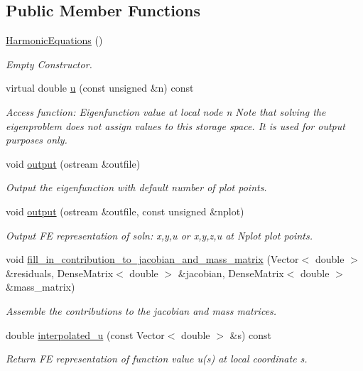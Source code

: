 \subsection*{Public Member Functions}
\begin{DoxyCompactItemize}
\item 
\hyperlink{classHarmonicEquations_a288d1c0777b2cf5360e1310d48f8c217}{Harmonic\+Equations} ()
\begin{DoxyCompactList}\small\item\em Empty Constructor. \end{DoxyCompactList}\item 
virtual double \hyperlink{classHarmonicEquations_ab801694318460d371e066419263995d7}{u} (const unsigned \&n) const
\begin{DoxyCompactList}\small\item\em Access function\+: Eigenfunction value at local node n Note that solving the eigenproblem does not assign values to this storage space. It is used for output purposes only. \end{DoxyCompactList}\item 
void \hyperlink{classHarmonicEquations_abe34292042ce1394f8979618ee10f354}{output} (ostream \&outfile)
\begin{DoxyCompactList}\small\item\em Output the eigenfunction with default number of plot points. \end{DoxyCompactList}\item 
void \hyperlink{classHarmonicEquations_ab5e53f73bbefb6509ad014c3b236e31f}{output} (ostream \&outfile, const unsigned \&nplot)
\begin{DoxyCompactList}\small\item\em Output FE representation of soln\+: x,y,u or x,y,z,u at Nplot plot points. \end{DoxyCompactList}\item 
void \hyperlink{classHarmonicEquations_a0b756d9ac8dd9c7b9b7785c06f4fce77}{fill\+\_\+in\+\_\+contribution\+\_\+to\+\_\+jacobian\+\_\+and\+\_\+mass\+\_\+matrix} (Vector$<$ double $>$ \&residuals, Dense\+Matrix$<$ double $>$ \&jacobian, Dense\+Matrix$<$ double $>$ \&mass\+\_\+matrix)
\begin{DoxyCompactList}\small\item\em Assemble the contributions to the jacobian and mass matrices. \end{DoxyCompactList}\item 
double \hyperlink{classHarmonicEquations_a5d1ba796d0b62885cab6ef47a83f6b08}{interpolated\+\_\+u} (const Vector$<$ double $>$ \&s) const
\begin{DoxyCompactList}\small\item\em Return FE representation of function value u(s) at local coordinate s. \end{DoxyCompactList}\end{DoxyCompactItemize}
